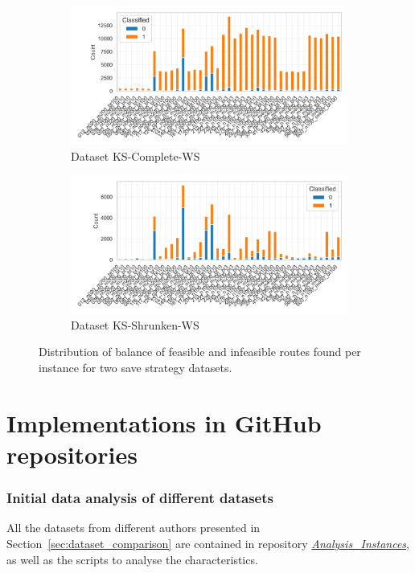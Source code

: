 \begin{figure}[!ht]
	\centering
	\begin{subfigure}[t]{.5\textwidth}
		\centering
		\includegraphics[width=\linewidth]{pictures/dataset_structure/distribution_plot_krebs_28880_600_WS.png}
		\caption{Dataset KS-Complete-WS}
		\label{fig:ds-a-krebs_x}
	\end{subfigure}%
	\begin{subfigure}[t]{.5\textwidth}
		\centering
		\includegraphics[width=\linewidth]{pictures/dataset_structure/distribution_plot_krebs_28880_600_WS_Shrinked094.png}
		\caption{Dataset KS-Shrunken-WS}
		\label{fig:ds-b-krebs_l}
	\end{subfigure}
	\caption{Distribution of balance of feasible and infeasible routes found per \krebsADataSetText instance for two save strategy datasets.}
	\label{fig:route-feasibility_save_krebs}
\end{figure}

\clearpage
\section{Implementations in GitHub repositories}
\label{app:sec:github_implementations}

\subsubsection{Initial data analysis of different datasets}
All the datasets from different authors presented in Section~\ref{sec:dataset_comparison} are contained in repository
\href{https://github.com/MxHbm/Analysis_Instances}{\textit{Analysis\_Instances}}, as well as the scripts to analyse the characteristics.

